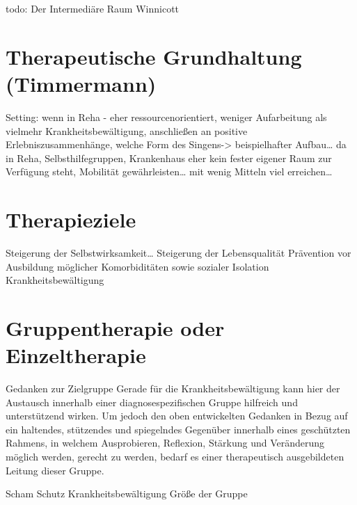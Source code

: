 todo: Der Intermediäre Raum Winnicott


\section{Therapeutische Grundhaltung (Timmermann)} 
Setting: wenn in Reha - eher ressourcenorientiert, weniger Aufarbeitung als vielmehr Krankheitsbewältigung, anschließen an positive Erlebniszusammenhänge, welche Form des Singens-> beispielhafter Aufbau… da in Reha, Selbsthilfegruppen, Krankenhaus eher kein fester eigener Raum zur Verfügung steht, Mobilität gewährleisten… mit wenig Mitteln viel erreichen…

\section{Therapieziele}
Steigerung der Selbstwirksamkeit…
Steigerung der Lebensqualität
Prävention vor Ausbildung möglicher Komorbiditäten sowie sozialer Isolation
Krankheitsbewältigung

\section{Gruppentherapie oder Einzeltherapie}
Gedanken zur Zielgruppe
Gerade für die Krankheitsbewältigung kann hier der Austausch innerhalb einer diagnosespezifischen Gruppe hilfreich und unterstützend wirken. Um jedoch den oben entwickelten Gedanken in Bezug auf ein haltendes, stützendes und spiegelndes Gegenüber innerhalb eines geschützten Rahmens, in welchem Ausprobieren, Reflexion, Stärkung und Veränderung möglich werden, gerecht zu werden, bedarf es einer therapeutisch ausgebildeten Leitung dieser Gruppe. 

Scham
Schutz
Krankheitsbewältigung
Größe der Gruppe

